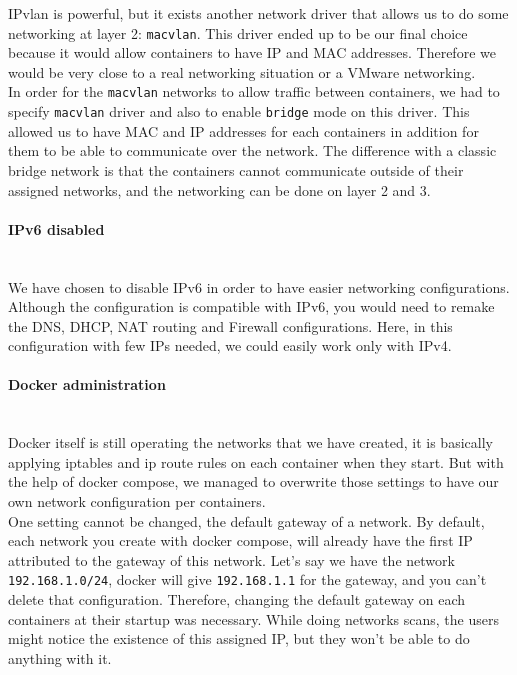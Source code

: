 \documentclass[a4paper,11pt,singlespacing]{article}
\begin{document}
IPvlan is powerful, but it exists another network driver that allows us to do some networking at layer 2: \texttt{macvlan}. This driver ended up to be our final choice because it would allow containers to have IP and MAC addresses. Therefore we would be very close to a real networking situation or a VMware networking.\\

In order for the \texttt{macvlan} networks to allow traffic between containers, we had to specify \texttt{macvlan} driver and also to enable \texttt{bridge} mode on this driver. This allowed us to have MAC and IP addresses for each containers in addition for them to be able to communicate over the network. The difference with a classic bridge network is that the containers cannot communicate outside of their assigned networks, and the networking can be done on layer 2 and 3. 

\paragraph{IPv6 disabled}
\leavevmode\\
We have chosen to disable IPv6 in order to have easier networking configurations. Although the configuration is compatible with IPv6, you would need to remake the DNS, DHCP, NAT routing and Firewall configurations. Here, in this configuration with few IPs needed, we could easily work only with IPv4.

\paragraph{Docker administration}
\leavevmode\\        
Docker itself is still operating the networks that we have created, it is basically applying iptables and ip route rules on each container when they start. But with the help of docker compose, we managed to overwrite those settings to have our own network configuration per containers.\\

One setting cannot be changed, the default gateway of a network. By default, each network you create with docker compose, will already have the first IP attributed to the gateway of this network. Let's say we have the network \texttt{192.168.1.0/24}, docker will give \texttt{192.168.1.1} for the gateway, and you can't delete that configuration. Therefore, changing the default gateway on each containers at their startup was necessary. While doing networks scans, the users might notice the existence of this assigned IP, but they won't be able to do anything with it.\\
\end{document}
